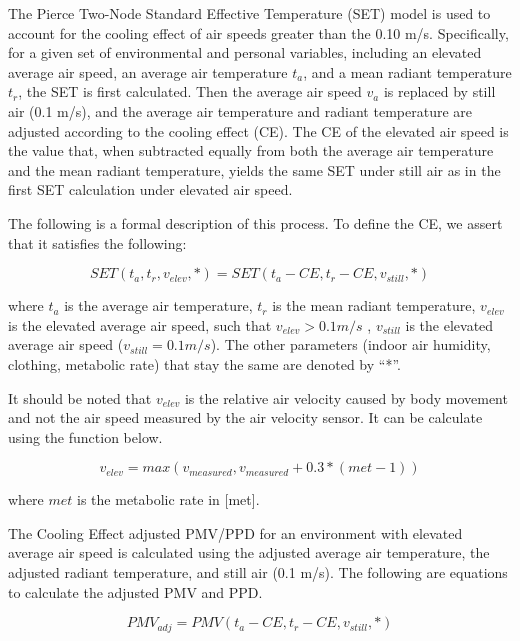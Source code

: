 The Pierce Two-Node Standard Effective Temperature (SET) model is used to account for the cooling effect of air speeds greater than the 0.10 m/s. Specifically, for a given set of environmental and personal variables, including an elevated average air speed, an average air temperature \(t_{a}\), and a mean radiant temperature \(t_{r}\), the SET is first calculated. Then the average air speed \(v_{a}\) is replaced by still air (0.1 m/s), and the average air temperature and radiant temperature are adjusted according to the cooling effect (CE). The CE of the elevated air speed is the value that, when subtracted equally from both the average air temperature and the mean radiant temperature, yields the same SET under still air as in the first SET calculation under elevated air speed.

The following is a formal description of this process. To define the CE, we assert that it satisfies the following:

\begin{equation}
SET(t_{a}, t_{r}, v_{elev}, *) = SET(t_{a} - CE, t_{r} - CE, v_{still}, *)
\end{equation}

where \(t_{a}\) is the average air temperature, \(t_{r}\) is the mean radiant temperature, \(v_{elev}\) is the elevated average air speed, such that \(v_{elev} > 0.1 m/s\) , \(v_{still}\) is the elevated average air speed (\(v_{still} = 0.1 m/s\)). The other parameters (indoor air humidity, clothing, metabolic rate) that stay the same are denoted by “*”.

It should be noted that \(v_{elev}\) is the relative air velocity caused by body movement and not the air speed measured by the air velocity sensor. It can be calculate using the function below.

\begin{equation}
v_{elev} = max(v_{measured}, v_{measured} + 0.3 * (met - 1))
\end{equation}

where \(met\) is the metabolic rate in [met].

The Cooling Effect adjusted PMV/PPD for an environment with elevated average air speed is calculated using the adjusted average air temperature, the adjusted radiant temperature, and still air (0.1 m/s). The following are equations to calculate the adjusted PMV and PPD.

\begin{equation}
PMV_{adj} = PMV(t_{a} - CE, t_{r} - CE, v_{still}, *)
\end{equation}

